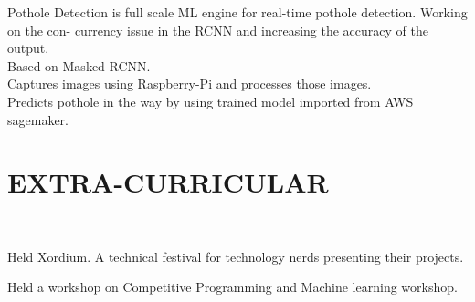 \documentclass[a4paper]{deedy-resume-openfont}
\begin{document}
\begin{minipage}[t]{0.66\textwidth}
Pothole Detection is full scale ML engine for real-time pothole detection.
Working on the con- currency issue in the RCNN and increasing the accuracy
of the output.\\
\textbullet{} Based on Masked-RCNN. \\
\textbullet{} Captures images using Raspberry-Pi and processes those images. \\
\textbullet{} Predicts pothole in the way by using trained model imported from AWS sagemaker. \\
\sectionsep
\section{EXTRA-CURRICULAR}

 \\
\vspace{\topsep} %
\begin{tightemize}
\item Held Xordium. A technical festival for technology nerds presenting their projects.
\item Held a workshop on Competitive Programming and Machine learning workshop.
\end{tightemize}
\sectionsep

\end{minipage}
\end{document}
